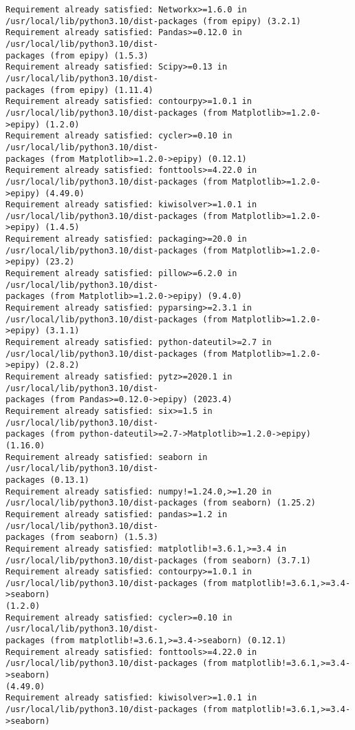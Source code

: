 \documentclass[11pt]{article}
\begin{document}
\begin{Verbatim}[commandchars=\\\{\}]
Requirement already satisfied: Networkx>=1.6.0 in
/usr/local/lib/python3.10/dist-packages (from epipy) (3.2.1)
Requirement already satisfied: Pandas>=0.12.0 in /usr/local/lib/python3.10/dist-
packages (from epipy) (1.5.3)
Requirement already satisfied: Scipy>=0.13 in /usr/local/lib/python3.10/dist-
packages (from epipy) (1.11.4)
Requirement already satisfied: contourpy>=1.0.1 in
/usr/local/lib/python3.10/dist-packages (from Matplotlib>=1.2.0->epipy) (1.2.0)
Requirement already satisfied: cycler>=0.10 in /usr/local/lib/python3.10/dist-
packages (from Matplotlib>=1.2.0->epipy) (0.12.1)
Requirement already satisfied: fonttools>=4.22.0 in
/usr/local/lib/python3.10/dist-packages (from Matplotlib>=1.2.0->epipy) (4.49.0)
Requirement already satisfied: kiwisolver>=1.0.1 in
/usr/local/lib/python3.10/dist-packages (from Matplotlib>=1.2.0->epipy) (1.4.5)
Requirement already satisfied: packaging>=20.0 in
/usr/local/lib/python3.10/dist-packages (from Matplotlib>=1.2.0->epipy) (23.2)
Requirement already satisfied: pillow>=6.2.0 in /usr/local/lib/python3.10/dist-
packages (from Matplotlib>=1.2.0->epipy) (9.4.0)
Requirement already satisfied: pyparsing>=2.3.1 in
/usr/local/lib/python3.10/dist-packages (from Matplotlib>=1.2.0->epipy) (3.1.1)
Requirement already satisfied: python-dateutil>=2.7 in
/usr/local/lib/python3.10/dist-packages (from Matplotlib>=1.2.0->epipy) (2.8.2)
Requirement already satisfied: pytz>=2020.1 in /usr/local/lib/python3.10/dist-
packages (from Pandas>=0.12.0->epipy) (2023.4)
Requirement already satisfied: six>=1.5 in /usr/local/lib/python3.10/dist-
packages (from python-dateutil>=2.7->Matplotlib>=1.2.0->epipy) (1.16.0)
Requirement already satisfied: seaborn in /usr/local/lib/python3.10/dist-
packages (0.13.1)
Requirement already satisfied: numpy!=1.24.0,>=1.20 in
/usr/local/lib/python3.10/dist-packages (from seaborn) (1.25.2)
Requirement already satisfied: pandas>=1.2 in /usr/local/lib/python3.10/dist-
packages (from seaborn) (1.5.3)
Requirement already satisfied: matplotlib!=3.6.1,>=3.4 in
/usr/local/lib/python3.10/dist-packages (from seaborn) (3.7.1)
Requirement already satisfied: contourpy>=1.0.1 in
/usr/local/lib/python3.10/dist-packages (from matplotlib!=3.6.1,>=3.4->seaborn)
(1.2.0)
Requirement already satisfied: cycler>=0.10 in /usr/local/lib/python3.10/dist-
packages (from matplotlib!=3.6.1,>=3.4->seaborn) (0.12.1)
Requirement already satisfied: fonttools>=4.22.0 in
/usr/local/lib/python3.10/dist-packages (from matplotlib!=3.6.1,>=3.4->seaborn)
(4.49.0)
Requirement already satisfied: kiwisolver>=1.0.1 in
/usr/local/lib/python3.10/dist-packages (from matplotlib!=3.6.1,>=3.4->seaborn)

\end{Verbatim}
\end{document}
